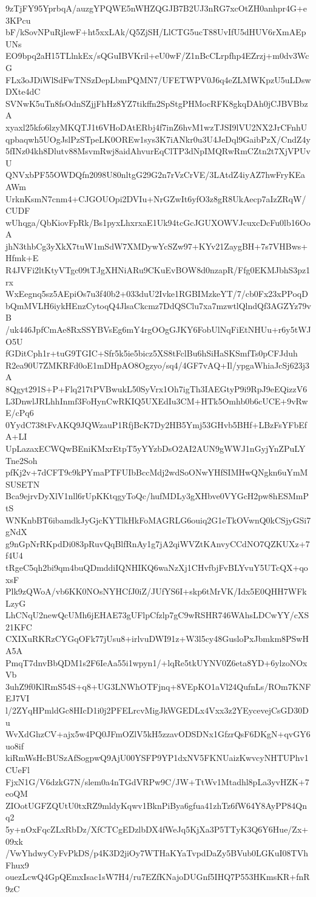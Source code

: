 9zTjFY95YprbqA/auzgYPQWE5nWHZQGJB7B2UJ3nRG7xcOtZH0anhpr4G+e3KPcu
bF/kSovNPuRjlewF+ht5xxLAk/Q5ZjSH/LlCTG5ucT88UvIfU5dHUV6rXmAEpUNs
EO9bpq2aH15TLlnkEx/sQGuIBVKril+eU0wF/Z1nBcCLrpfhp4EZrzj+m0dv3WcG
FLx3oJDiWlSdFwTNSzDepLbmPQMN7/UFETWPV0J6q4eZLMWKpzU5uLDswDXte4dC
SVNwK5uTn8fsOdnSZjjFhHz8YZ7tikffn2SpStgPHMocRFK8gkqDAh0jCJBVBbzA
xyaxl25kfo6lzyMKQTJ1t6VHoDAtERbj4f7inZ6hvM1wzTJSI9lVU2NX2JrCFnhU
qpbaqwh5UOgJslPzSTpeLK0OREw1sys3K7iANkr0u3U4JeDql9GaibPzX/CndZ4y
5fINz04kh8Dlutv88MsvmRwj8aidAhvurEqClTP3dNpIMQRwRmCZtn2t7XjVPUvU
QNVxbPF55OWDQfn2098U80nltgG29G2n7rVzCrVE/3LAtdZ4iyAZ7hwFryKEaAWm
UrknKsmN7cnm4+CJGOUOpi2DVIu+NrGZwIt6yfO3z8gR8UkAecp7aIzZRqW/CUDF
wUhqga/QbKiovFpRk/Bs1pyxLhxrxaE1Uk94tcGcJGUXOWVJcuxcDcFu0lb16OoA
jhN3thbCg3yXkX7tuW1mSdW7XMDywYcSZw97+KYv21ZaygBH+7s7VHBws+Hfmk+E
R4JVFi2ltKtyVTgc09tTJgXHNiARu9CKuEvBOW8d0nzapR/Ffg0EKMJbhS3pz1rx
WxEegnq5sz5AEpiOs7u3f40b2+033duU2Ivke1RGBIMzkeYT/7/cb0Fx23xPPoqD
bQmMVLH6iykHEnzCytoqQ4JlsaCkcmz7DdQSClu7xa7mzwtlQlndQf3AGZYz79vB
/uk446JpfCmAe8RxSSYBVsEg6mY4rgOOgGJKY6FobUlNqFiEtNHUu+r6y5tWJO5U
fGDitCph1r+tuG9TGIC+Sfr5k5ie5bicz5XS8tFclBu6hSiHaSKSmfTs0pCFJduh
R2ea90U7ZMKRFd0oE1mDHpAO8Ogzyo/sq4/4GF7vAQ+Il/ypgaWhiaJcSj623j3A
8Qgyt291S+P+Flq217tPVBwukL50SyVrx1Oh7igTh3IAEGtyP9i9RpJ9eEQizzV6
L3DnwlJRLhhInmf3FoHynCwRKIQ5UXEdIu3CM+HTk5Omhb0b6cUCE+9vRwE/cPq6
0YydC738tFvAKQ9JQWzauP1RfjBcK7Dy2HB5Ymj53GHvb5BHf+LBzFsYFbEfA+LI
UpLazaxECWQwBEniKMxrEtpT5yYYzbDsO2AI2AUN9gWWJ1nGyjYnZPuLYTne2Soh
pfKj2v+7dCFT9c9kPYmaPTFUIbBccMdj2wdSoONwYHfSIMHwQNgkn6uYmMSUSETN
Bca9ejrvDyXlV1nll6rUpKKtqgyToQc/hufMDLy3gXHbve0VYGcH2pw8hESMmPtS
WNKnbBT6ibamdkJyGjcKYTlkHkFoMAGRLG6ouiq2G1eTkOVwnQ0kCSjyGSi7gNdX
g9nGpNrRKpdDi083pRuvQqBlfRnAy1g7jA2qiWVZtKAnvyCCdNO7QZKUXz+7f4U4
tRgeC5qh2bi9qm4buQDmddiIQNHIKQ6waNzXj1CHvfbjFvBLYvuY5UTcQX+qoxsF
Plk9zQWoA/vb6KK0NOsNYHCfJ0iZ/JUfYS6I+skp6tMrVK/Idx5E0QHH7WFkLzyG
LhCNqU2newQcUMh6jEHAE73gUFlpCfzlp7gC9wRSHR746WAhsLDCwYY/cXS21KFC
CXIXuRKRzCYGqOFk77jUsu8+irlvuDWI91z+W3l5cy48GusloPxJbmkm8PSwHA5A
PmqT7dnvBbQDM1s2F6IeAa55i1wpyn1/+lqRe5tkUYNV0Z6eta8YD+6ylzoNOxVb
3uhZ9f0KlRmS54S+q8+UG3LNWhOTFjnq+8VEpKO1aVl24QufnLs/ROm7KNFEJ7VI
l/2ZYqHPmldGc8HIcD1i0j2PFELrcvMigJkWGEDLx4Vxx3z2YEycevejCsGD30Du
WvXdGhzCV+ajx5w4PQ0JFmOZlV5kH5zzavODSDNx1GfzrQsF6DKgN+qvGY6uo8if
kiRmWsHcBUSzAfSogpwQ9AjU00YSFP9YP1dxNV5FKNUaizKwvcyNHTUPhv1CUeFl
FjxN1G/V6dzkG7N/slem0a4nTGdVRPw9C/JW+TtWv1Mtadhl8pLa3yvHZK+7eoQM
ZIOotUGFZQUtU0txRZ9mldyKqwv1BknPiBya6gfua41zhTz6fW64Y8AyPP84Qnq2
5y+nOxFqcZLxRbDz/XfCTCgEDzlbDX4fWeJq5KjXa3P5TTyK3Q6Y6Hue/Zx+09xk
/VwYhdwyCyFvPkDS/p4K3D2jiOy7WTHaKYaTvpdDaZy5BVub0LGKuI08TVhFhux9
ouezLcwQ4GpQEmxIsac1sW7H4/ru7EZfKNajoDUGnf5IHQ7P553HKmsKR+fnR9zC
